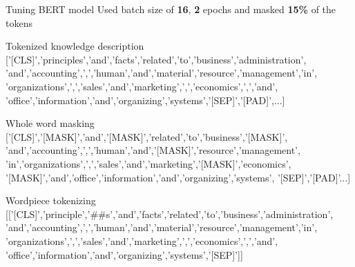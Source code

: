 \documentclass{beamer}
\begin{document}
\begin{frame}{Tuning BERT model}
 \scriptsize
  Used batch size of \textbf{16}, \textbf{2} epochs and masked \textbf{15\%} of the tokens

  \begin{exampleblock}{Tokenized knowledge description}
    ['[CLS]','principles','and','facts','related','to','business','administration',
    'and','accounting',',','human','and','material','resource','management','in',
    'organizations',',','sales','and','marketing',',','economics',',','and',
    'office','information','and','organizing','systems','[SEP]','[PAD]',...]
  \end{exampleblock}

  \begin{exampleblock}{Whole word masking}
    ['[CLS]','[MASK]','and','[MASK]','related','to','business','[MASK]',
    'and','accounting',',','human','and','[MASK]','resource','management',
    'in','organizations',',','sales','and','marketing','[MASK]','economics',
    '[MASK]','and','office','information','and','organizing','systems',
    '[SEP]','[PAD]'...]
  \end{exampleblock}

  \begin{exampleblock}{Wordpiece\cite{wordpiece} tokenizing}
    [['[CLS]','principle','\#\#s','and','facts','related','to','business','administration',
    'and','accounting',',','human','and','material','resource','management','in',
    'organizations',',','sales','and','marketing',',','economics',',','and',
    'office','information','and','organizing','systems','[SEP]']]
  \end{exampleblock}
  
\end{frame}

\end{document}
